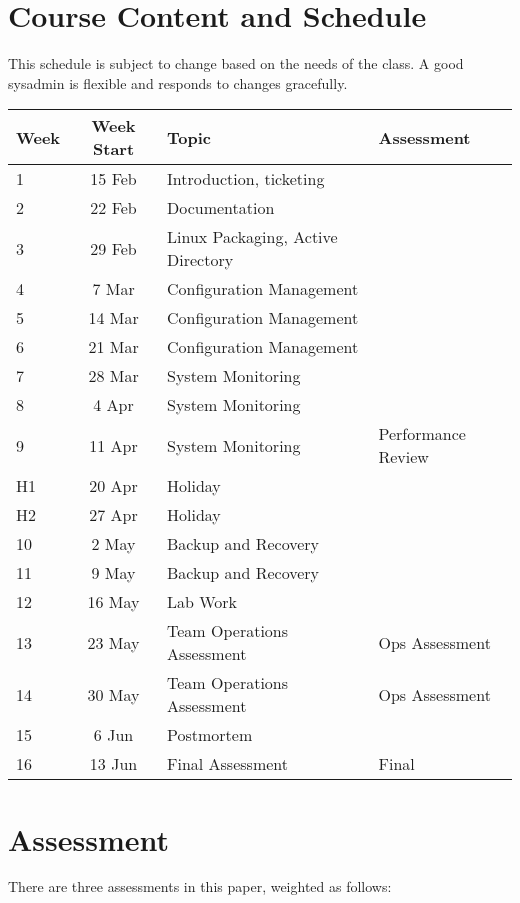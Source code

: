 \documentclass{article}
\begin{document}

\section*{Course Content and Schedule}
This schedule is subject to change based on the needs of the class. A good sysadmin is flexible and responds to changes gracefully.

\renewcommand{\arraystretch}{1.5}
\begin{tabular}{|l|c|l|l|}
\hline
 Week & Week Start & Topic                   & Assessment     \\ \hline
 1    & 15 Feb     & Introduction, ticketing & \\ \hline
 2    & 22 Feb     & Documentation           & \\ \hline
 3    & 29 Feb     & Linux Packaging, Active Directory  & \\ \hline
 4    &  7 Mar     & Configuration Management &    \\ \hline
5    & 14 Mar     & Configuration Management &     \\ \hline
6    & 21 Mar     & Configuration Management &     \\ \hline
 7    & 28 Mar     & System Monitoring  &  \\ \hline
 8   &  4 Apr     & System Monitoring  & \\ \hline
 9   & 11 Apr     & System Monitoring  & Performance Review\\ \hline
 H1    & 20 Apr     & Holiday & \\ \hline
 H2    & 27 Apr     & Holiday  & \\ \hline
 10   &  2 May     & Backup and Recovery & \\ \hline
 11   & 9 May     & Backup and Recovery &  \\ \hline
 12   & 16 May     & Lab Work &  \\ \hline
 13   & 23 May     & Team Operations Assessment &  Ops Assessment \\ \hline
 14   &  30 May     & Team Operations Assessment &  Ops Assessment \\ \hline
 15   &  6 Jun     & Postmortem &  \\ \hline
 16   & 13 Jun     & Final Assessment & Final \\ \hline
\end{tabular}

\newpage 

\section*{Assessment}
There are three assessments in this paper, weighted as follows:
\end{document}
